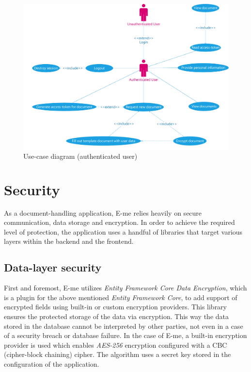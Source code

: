 \begin{figure}[H]
	\centering
	\includegraphics[scale=0.50]{use-case-diagram}
	\caption{Use-case diagram (authenticated user)}
\end{figure}

\section{Security}

As a document-handling application, E-me relies heavily on secure communication, data storage and encryption.
In order to achieve the required level of protection, the application uses a handful of libraries that target various layers within the backend and the frontend.

\subsection{Data-layer security}

First and foremost, E-me utilizes \emph{Entity Framework Core Data Encryption}, which is a plugin for the above mentioned \emph{Entity Framework Core},
 to add support of encrypted fields using built-in or custom encryption providers.
This library ensures the protected storage of the data via encryption.
This way the data stored in the database cannot be interpreted by other parties, not even in a case of a security breach or database failure.
In the case of E-me, a built-in encryption provider is used which enables \emph{AES-256} encryption configured with a CBC (cipher-block chaining) cipher.
The algorithm uses a secret key stored in the configuration of the application.

